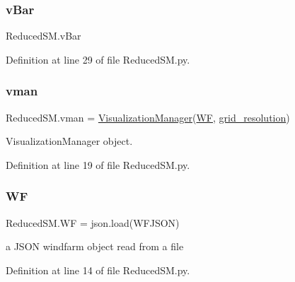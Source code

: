 \subsubsection{\texorpdfstring{v\+Bar}{vBar}}
{\footnotesize\ttfamily Reduced\+S\+M.\+v\+Bar}



Definition at line 29 of file Reduced\+S\+M.\+py.

\mbox{\label{namespace_reduced_s_m_aea7c8ee42c44fbc9f8c3702567edc840}} 
\subsubsection{\texorpdfstring{vman}{vman}}
{\footnotesize\ttfamily Reduced\+S\+M.\+vman = \mbox{\hyperlink{classvisualization__manager___d_j_1_1_visualization_manager}{Visualization\+Manager}}(\mbox{\hyperlink{namespace_reduced_s_m_ad2cb878a0bc5ba18176fff5ab9b02dc3}{WF}}, \mbox{\hyperlink{namespace_reduced_s_m_ac73e3bc6b17648d508dd822d76929524}{grid\+\_\+resolution}})}



Visualization\+Manager object. 



Definition at line 19 of file Reduced\+S\+M.\+py.

\mbox{\label{namespace_reduced_s_m_ad2cb878a0bc5ba18176fff5ab9b02dc3}} 
\subsubsection{\texorpdfstring{WF}{WF}}
{\footnotesize\ttfamily Reduced\+S\+M.\+WF = json.\+load(W\+F\+J\+S\+ON)}



a J\+S\+ON windfarm object read from a file 



Definition at line 14 of file Reduced\+S\+M.\+py.

